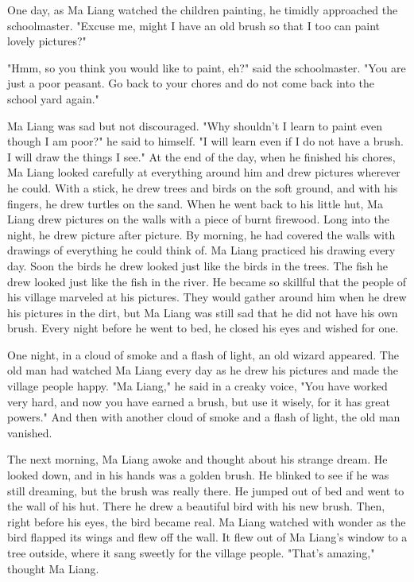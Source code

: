 One day, as Ma Liang watched the children painting, he timidly approached the schoolmaster. "Excuse me, might I have an old brush so that I too can paint lovely pictures?"

"Hmm, so you think you would like to paint, eh?" said the schoolmaster. "You are just a poor peasant. Go back to your chores and do not come back into the school yard again."

Ma Liang was sad but not discouraged. "Why shouldn't I learn to paint even though I am poor?" he said to himself. "I will learn even if I do not have a brush. I will draw the things I see." At the end of the day, when he finished his chores, Ma Liang looked carefully at everything around him and drew pictures wherever he could. With a stick, he drew trees and birds on the soft ground, and with his fingers, he drew turtles on the sand. When he went back to his little hut, Ma Liang drew pictures on the walls with a piece of burnt firewood. Long into the night, he drew picture after picture. By morning, he had covered the walls with drawings of everything he could think of. Ma Liang practiced his drawing every day. Soon the birds he drew looked just like the birds in the trees. The fish he drew looked just like the fish in the river. He became so skillful that the people of his village marveled at his pictures. They would gather around him when he drew his pictures in the dirt, but Ma Liang was still sad that he did not have his own brush. Every night before he went to bed, he closed his eyes and wished for one.

One night, in a cloud of smoke and a flash of light, an old wizard appeared. The old man had watched Ma Liang every day as he drew his pictures and made the village people happy. "Ma Liang," he said in a creaky voice, "You have worked very hard, and now you have earned a brush, but use it wisely, for it has great powers." And then with another cloud of smoke and a flash of light, the old man vanished.

The next morning, Ma Liang awoke and thought about his strange dream. He looked down, and in his hands was a golden brush. He blinked to see if he was still dreaming, but the brush was really there. He jumped out of bed and went to the wall of his hut. There he drew a beautiful bird with his new brush. Then, right before his eyes, the bird became real. Ma Liang watched with wonder as the bird flapped its wings and flew off the wall. It flew out of Ma Liang's window to a tree outside, where it sang sweetly for the village people. "That's amazing," thought Ma Liang.

